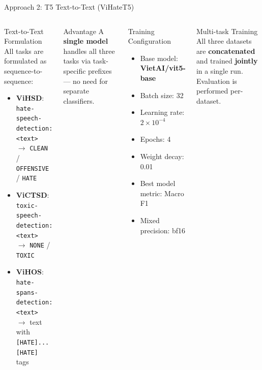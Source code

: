 \documentclass[10pt, aspectratio=169]{beamer}
\begin{document}
\begin{frame}[shrink=8]{Approach 2: T5 Text-to-Text (ViHateT5)}
  \begin{columns}[T]
    \begin{block}{Text-to-Text Formulation}
      All tasks are formulated as sequence-to-sequence:
      \begin{itemize}
        \item \textbf{ViHSD}: \texttt{hate-speech-detection: <text>}\\
              $\rightarrow$ \texttt{CLEAN} / \texttt{OFFENSIVE} / \texttt{HATE}
        \item \textbf{ViCTSD}: \texttt{toxic-speech-detection: <text>}\\
              $\rightarrow$ \texttt{NONE} / \texttt{TOXIC}
        \item \textbf{ViHOS}: \texttt{hate-spans-detection: <text>}\\
              $\rightarrow$ text with \texttt{[HATE]...[HATE]} tags
      \end{itemize}
    \end{block}
    \vspace{0.2cm}
    \begin{exampleblock}{Advantage}
      A \textbf{single model} handles all three tasks via task-specific prefixes --- no need for separate classifiers.
    \end{exampleblock}

    \begin{block}{Training Configuration}
      \begin{itemize}
        \item Base model: \textbf{VietAI/vit5-base}
        \item Batch size: 32
        \item Learning rate: $2 \times 10^{-4}$
        \item Epochs: 4
        \item Weight decay: 0.01
        \item Best model metric: Macro F1
        \item Mixed precision: bf16
      \end{itemize}
    \end{block}
    \vspace{0.2cm}
    \begin{block}{Multi-task Training}
      All three datasets are \textbf{concatenated} and trained \textbf{jointly} in a single run. Evaluation is performed per-dataset.
    \end{block}
  \end{columns}
\end{frame}
\end{document}
